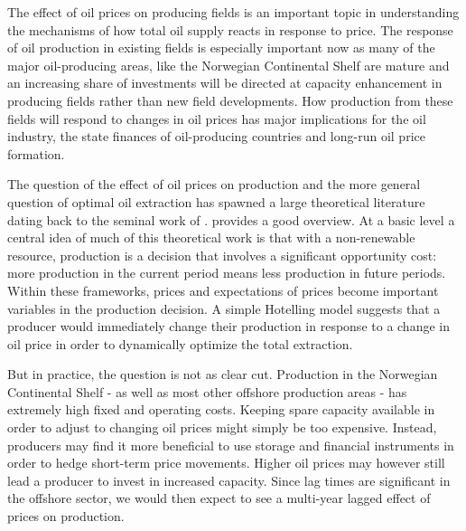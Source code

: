 \documentclass[12pt]{article}
\begin{document}

The effect of oil prices on producing fields is an important topic in understanding the mechanisms of how total oil supply reacts in response to price. The response of oil production in existing fields is especially important now as many of the major oil-producing areas, like the Norwegian Continental Shelf are mature and an increasing share of investments will be directed at capacity enhancement in producing fields rather than new field developments. How production from these fields will respond to changes in oil prices has major implications for the oil industry, the state finances of oil-producing countries and long-run oil price formation.

The question of the effect of oil prices on production and the more general question of optimal oil extraction has spawned a large theoretical literature dating back to the seminal work of \citet{hotelling_economics_1931}. \citet{krautkraemer_nonrenewable_1998} provides a good overview. At a basic level a central idea of much of this theoretical work is that with a non-renewable resource, production is a decision that involves a significant opportunity cost: more production in the current period means less production in future periods.  Within these frameworks, prices and expectations of prices become important variables in the production decision. A simple Hotelling model suggests that a producer would immediately change their production in response to a change in oil price in order to dynamically optimize the total extraction.

But in practice, the question is not as clear cut.  Production in the Norwegian Continental Shelf - as well as most other offshore production areas - has extremely high fixed and operating costs.  Keeping spare capacity available in order to adjust to changing oil prices might simply be too expensive.  Instead, producers may find it more beneficial to use storage and financial instruments in order to hedge short-term price movements. Higher oil prices may however still lead a producer to invest in increased capacity.  Since lag times are significant in the offshore sector, we would then expect to see a multi-year lagged effect of prices on production.  
\end{document}
